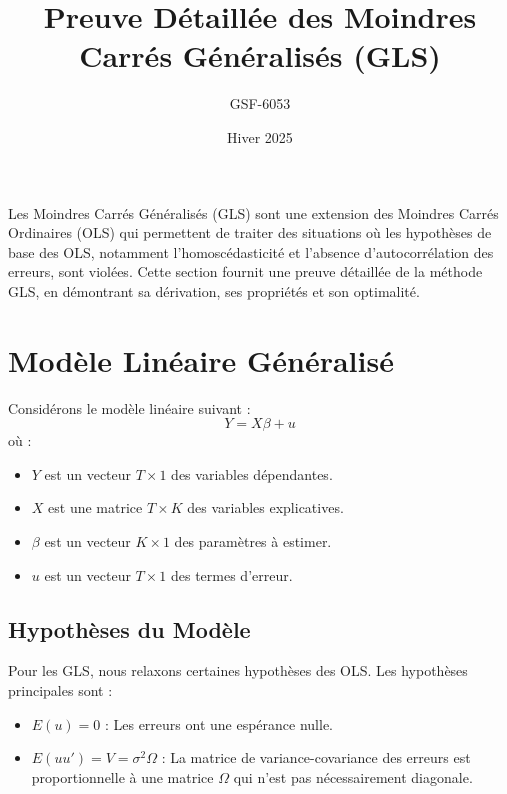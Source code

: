 \documentclass[14pt]{extarticle} %
\title{\Huge Preuve Détaillée des Moindres Carrés Généralisés (GLS)}
\author{GSF-6053}
\date{Hiver 2025}
\theoremstyle{definition}
\theoremstyle{plain}
\begin{document}
\maketitle

\tableofcontents
\newpage

\onehalfspacing



Les Moindres Carrés Généralisés (GLS) sont une extension des Moindres Carrés Ordinaires (OLS) qui permettent de traiter des situations où les hypothèses de base des OLS, notamment l'homoscédasticité et l'absence d'autocorrélation des erreurs, sont violées. Cette section fournit une preuve détaillée de la méthode GLS, en démontrant sa dérivation, ses propriétés et son optimalité.

\section{Modèle Linéaire Généralisé}

Considérons le modèle linéaire suivant :
\begin{equation}
    Y = X\beta + u
\end{equation}
où :
\begin{itemize}
    \item \( Y \) est un vecteur \( T \times 1 \) des variables dépendantes.
    \item \( X \) est une matrice \( T \times K \) des variables explicatives.
    \item \( \beta \) est un vecteur \( K \times 1 \) des paramètres à estimer.
    \item \( u \) est un vecteur \( T \times 1 \) des termes d'erreur.
\end{itemize}

\subsection{Hypothèses du Modèle}

Pour les GLS, nous relaxons certaines hypothèses des OLS. Les hypothèses principales sont :
\begin{itemize}
    \item \( E(u) = 0 \) : Les erreurs ont une espérance nulle.
    \item \( E(uu') = V = \sigma^2 \Omega \) : La matrice de variance-covariance des erreurs est proportionnelle à une matrice \( \Omega \) qui n'est pas nécessairement diagonale.
\end{itemize}
\end{document}
